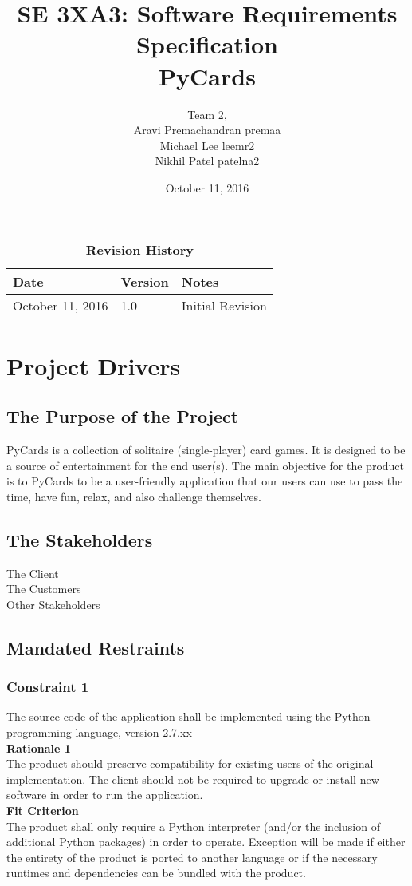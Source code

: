 \documentclass{article}
\title{SE 3XA3: Software Requirements Specification\\PyCards}
\author{Team 2,
		\\ Aravi Premachandran  premaa
		\\ Michael Lee  leemr2
		\\ Nikhil Patel  patelna2
}
\date{October 11, 2016}
\newcommand {\PYVER}{2.7.xx }
\begin{document}
	\maketitle

	\newpage
	\tableofcontents
	\listoftables
	\listoffigures

	\begin{table}[tp]
		\caption{\bf Revision History}
		\begin{tabularx}{\textwidth}{p{3cm}p{2cm}X}
			\toprule {\bf Date} & {\bf Version} & {\bf Notes}\\
			\midrule
			October 11, 2016 & 1.0 & Initial Revision\\
			\bottomrule
		\end{tabularx}
	\end{table}

	\newpage
	\section{Project Drivers}
		\subsection{The Purpose of the Project}
		\indent \indent PyCards is a collection of solitaire 
		(single-player) card games. It is designed to be a source of 
		entertainment for the end 
		user(s). The main objective for the product is to PyCards to be a 
		user-friendly application that our users can use to pass the time, have 
		fun, relax, and also challenge themselves.
	\subsection{The Stakeholders}
		The Client\\
		The Customers\\
		Other Stakeholders
	\subsection{Mandated Restraints}
		\subsubsection*{Constraint 1}  \label {constraint1}
		\indent The source code of the application shall be implemented 
		using the Python programming language, version \PYVER\\
		\textbf{Rationale 1}\\
		\indent The product should preserve compatibility for existing users of 
		the original implementation. The client should not be required to 
		upgrade or install new software in order to run the application.\\
		\textbf{Fit Criterion}\\
		\indent The product shall only require a Python interpreter 
		(and/or the inclusion of additional Python packages) in order to 
		operate. Exception will be made if either the entirety of the product 
		is ported to another language or if the necessary runtimes and 
		dependencies can be bundled with the product.\\\\
		
\end{document}
